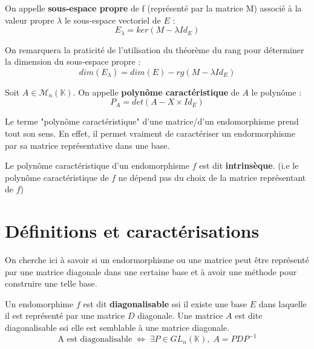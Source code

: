 \begin{definition}
    On appelle \textbf{sous-espace propre} de f (représenté par la matrice M) associé à la valeur propre $\lambda$ le sous-espace vectoriel de $E$ : 
    \[ \boxed{E_\lambda = ker(M - \lambda Id_E)} \]
\end{definition}

On remarquera la praticité de l'utilisation du théorème du rang pour déterminer la dimension du sous-espace propre : \[ dim(E_\lambda) = dim(E) - rg(M - \lambda Id_E) \]

\begin{definition}
    Soit $A \in \mathcal{M}_n(\mathbb{K}) $. On appelle \textbf{polynôme caractéristique} de $A$ le polynôme : 
    \[ P_A = det(A - X \times Id_E) \]
\end{definition}

Le terme "polynôme caractéristique" d'une matrice/d'un endomorphisme prend tout son sens. 
En effet, il permet vraiment de caractériser un endormorphisme par sa matrice représentative dans une base. 

\begin{remark}
    Le polynôme caractéristique d'un endomorphisme $f$ est dit \textbf{intrinsèque}.
    (i.e le polynôme caractéristique de $f$ ne dépend pas du choix de la matrice représentant de $f$)
\end{remark}




\section{Définitions et caractérisations}

On cherche ici à savoir si un endormorphisme ou une matrice peut être représenté par une matrice diagonale dans une certaine base 
et à avoir une méthode pour construire une telle base. 

\begin{definition}
    Un endomorphime $f$ est dit \textbf{diagonalisable} ssi il existe une base $E$ dans laquelle il est représenté par une matrice $D$ diagonale. 
    Une matrice $A$ est dite diagonalisable ssi elle est semblable à une matrice diagonale. 
    \[ \boxed{ \text{A est diagonalisable} \; \Leftrightarrow \; \exists P \in GL_n(\mathbb{K}), \; A = PDP^{-1} } \]
\end{definition}

